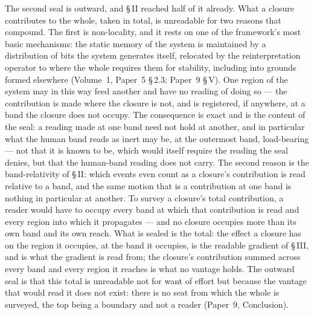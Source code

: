 \documentclass[11pt,oneside]{report}
\theoremstyle{definition}
\theoremstyle{remark}
\begin{document}
The second seal is outward, and \S\,II reached half of it already. What a closure contributes to the whole, taken in total, is unreadable for two reasons that compound. The first is non-locality, and it rests on one of the framework's most basic mechanisms: the static memory of the system is maintained by a distribution of bits the system generates itself, relocated by the reinterpretation operator to where the whole requires them for stability, including into grounds formed elsewhere (Volume~1, Paper~5 \S\,2.3; Paper~9 \S\,V). One region of the system may in this way feed another and have no reading of doing so --- the contribution is made where the closure is not, and is registered, if anywhere, at a band the closure does not occupy. The consequence is exact and is the content of the seal: a reading made at one band need not hold at another, and in particular what the human band reads as inert may be, at the outermost band, load-bearing --- not that it is known to be, which would itself require the reading the seal denies, but that the human-band reading does not carry. The second reason is the band-relativity of \S\,II: which events even count as a closure's contribution is read relative to a band, and the same motion that is a contribution at one band is nothing in particular at another. To survey a closure's total contribution, a reader would have to occupy every band at which that contribution is read and every region into which it propagates --- and no closure occupies more than its own band and its own reach. What is sealed is the total: the effect a closure has on the region it occupies, at the band it occupies, is the readable gradient of \S\,III, and is what the gradient is read from; the closure's contribution summed across every band and every region it reaches is what no vantage holds. The outward seal is that this total is unreadable not for want of effort but because the vantage that would read it does not exist: there is no seat from which the whole is surveyed, the top being a boundary and not a reader (Paper~9, Conclusion).
\end{document}
